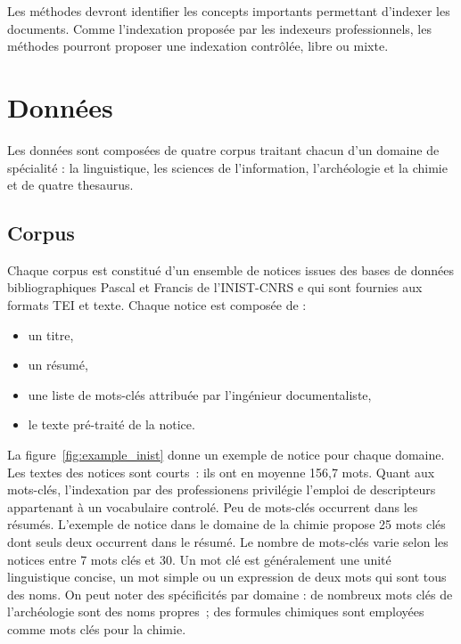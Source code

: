 \documentclass[10pt,twoside]{article}
\begin{document}
Les méthodes devront identifier les concepts importants permettant d’indexer les documents. Comme l’indexation proposée par les indexeurs professionnels, les méthodes pourront proposer une indexation contrôlée, libre ou mixte.
    
    \section{Données}
   Les données sont composées de quatre corpus traitant chacun d’un domaine de spécialité : la linguistique, les sciences de l’information, l’archéologie et la chimie et de quatre thesaurus. 

    \subsection{Corpus}
    
    Chaque corpus est constitué d'un ensemble de notices issues des bases de données bibliographiques Pascal et Francis de l’INIST-CNRS e qui sont fournies aux formats TEI et texte. Chaque notice est composée de :
        \begin{itemize}
        \item un titre,
        \item un résumé,
        \item une liste de mots-clés attribuée par l’ingénieur documentaliste,
        \item le texte pré-traité de la notice.
        \end{itemize}

La figure~\ref{fig:example_inist} donne un exemple de notice pour chaque domaine. Les textes des notices sont courts~: ils ont en moyenne 156,7 mots. Quant aux mots-clés, l'indexation par des professionens privilégie l'emploi de descripteurs appartenant à un vocabulaire controlé. Peu de mots-clés occurrent dans les résumés. L'exemple de notice dans le domaine de la chimie propose 25 mots clés dont seuls deux occurrent dans le résumé. Le nombre de mots-clés varie selon les notices entre 7 mots clés et 30.  Un mot clé est généralement une unité linguistique concise, un mot simple ou un expression de deux mots qui sont tous des noms. On peut noter des spécificités par domaine : de nombreux mots clés de l'archéologie sont des noms propres~; des formules chimiques sont employées comme mots clés pour la chimie.
\end{document}

